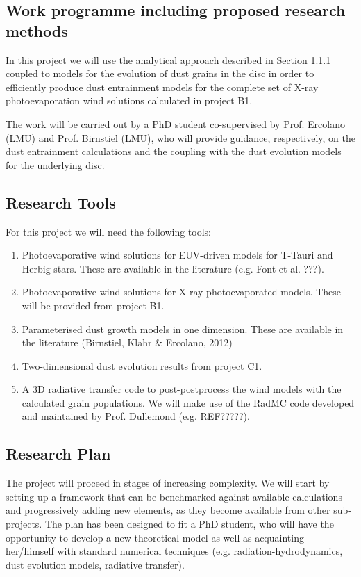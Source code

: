 \documentclass[10pt,fleqn,twoside]{article}
\newcommand{\Tcol}{\color{blue}}
\begin{document}
\subsection{\Tcol Work programme including proposed research methods}

In this project we will use the analytical approach described in
Section 1.1.1 coupled to models for the evolution of dust grains in
the disc in order to efficiently produce dust entrainment models for the
complete set of X-ray photoevaporation wind solutions calculated in
project B1. 

The work will be carried out by a PhD student co-supervised by
Prof. Ercolano (LMU) and Prof. Birnstiel (LMU), who will provide
guidance, respectively, on the dust entrainment calculations and the
coupling with the dust evolution models for the underlying disc. 

\subsection{Research Tools}

For this project we will need the following tools:
\begin{enumerate}
\item Photoevaporative wind solutions for EUV-driven
models for T-Tauri and Herbig stars. These are
available in the literature (e.g. Font et al. ???).
\item Photoevaporative wind solutions for X-ray photoevaporated
models. These will be provided from project B1.
\item Parameterised dust growth models in one dimension. These
are available in the literature (Birnstiel, Klahr \& Ercolano, 2012) 
\item Two-dimensional dust evolution results from project C1.
\item A 3D radiative transfer code to post-postprocess the wind
models with the calculated grain populations. We will make use  of the
RadMC code developed and maintained by Prof. Dullemond (e.g. REF?????).
\end{enumerate}

\subsection{Research Plan} 

The project will proceed in stages of increasing complexity. We will start
by setting up a framework that can be benchmarked against available
calculations and progressively adding new elements, as they become
available from other sub-projects. The plan has been designed to fit a
PhD student, who will have the opportunity to develop a new theoretical
model as well as acquainting her/himself with standard numerical
techniques (e.g. radiation-hydrodynamics, dust evolution models,
radiative transfer). 
\end{document}
